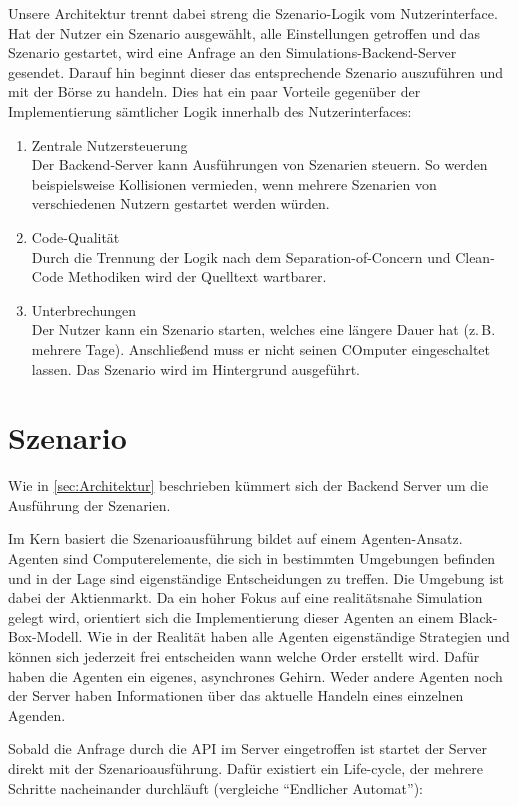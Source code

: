 Unsere Architektur trennt dabei streng die Szenario-Logik vom Nutzerinterface.
Hat der Nutzer ein Szenario ausgewählt, alle Einstellungen getroffen und das Szenario gestartet, wird eine Anfrage an den Simulations-Backend-Server gesendet. Darauf hin beginnt dieser das entsprechende Szenario auszuführen und mit der Börse zu handeln.
Dies hat ein paar Vorteile gegenüber der Implementierung sämtlicher Logik innerhalb des Nutzerinterfaces:
\begin{enumerate}
    \item Zentrale Nutzersteuerung\\
        Der Backend-Server kann Ausführungen von Szenarien steuern. So werden beispielsweise Kollisionen vermieden, wenn mehrere Szenarien von verschiedenen Nutzern gestartet werden würden.
    \item Code-Qualität\\
        Durch die Trennung der Logik nach dem Separation-of-Concern und Clean-Code Methodiken wird der Quelltext wartbarer.
    \item Unterbrechungen\\
        Der Nutzer kann ein Szenario starten, welches eine längere Dauer hat (z.\,B. mehrere Tage). Anschließend muss er nicht seinen COmputer eingeschaltet lassen. Das Szenario wird im Hintergrund ausgeführt.
\end{enumerate}

\section{Szenario}
Wie in \autoref{sec:Architektur} beschrieben kümmert sich der Backend Server um die Ausführung der Szenarien.

Im Kern basiert die Szenarioausführung bildet auf einem Agenten-Ansatz. Agenten sind Computerelemente, die sich in bestimmten Umgebungen befinden und in der Lage sind eigenständige Entscheidungen zu treffen. Die Umgebung ist dabei der Aktienmarkt.
Da ein hoher Fokus auf eine realitätsnahe Simulation gelegt wird, orientiert sich die Implementierung dieser Agenten an einem Black-Box-Modell.
Wie in der Realität haben alle Agenten eigenständige Strategien und können sich jederzeit frei entscheiden wann welche Order erstellt wird. Dafür haben die Agenten ein eigenes, asynchrones Gehirn.
Weder andere Agenten noch der Server haben Informationen über das aktuelle Handeln eines einzelnen Agenden.

Sobald die Anfrage durch die \ac{API} im Server eingetroffen ist startet der Server direkt mit der Szenarioausführung. Dafür existiert ein Life-cycle, der mehrere Schritte nacheinander durchläuft (vergleiche \enquote{Endlicher Automat}):

